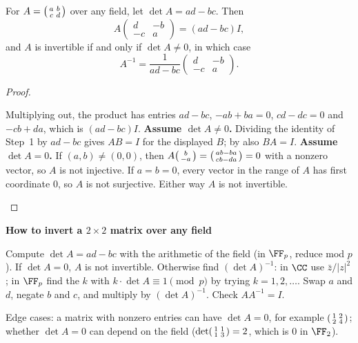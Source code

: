 \documentclass[10pt]{scrartcl}
\newenvironment{methodbox}[1]{\begin{mdframed}[style=methodstyle]\textbf{\color{NavyBlue}#1}\par\vspace{2pt}}{\end{mdframed}}
\begin{document}
\begin{proposition*}
  For $A=\begin{psmallmatrix}a&b\\c&d\end{psmallmatrix}$ over any field, let $\det A=ad-bc$. Then
  \[
    A\begin{pmatrix}d&-b\\-c&a\end{pmatrix}=(ad-bc)I,
  \]
  and $A$ is invertible if and only if $\det A\ne0$, in which case
  \[
    A^{-1}=\frac1{ad-bc}\begin{pmatrix}d&-b\\-c&a\end{pmatrix}.
  \]
\end{proposition*}
\begin{proof}
  \begin{steps}
    \ii Multiplying out, the product has entries $ad-bc$, $-ab+ba=0$, $cd-dc=0$ and $-cb+da$, which is $(ad-bc)I$.
    \ii \textbf{Assume $\det A\ne0$.} Dividing the identity of Step~1 by $ad-bc$ gives $AB=I$ for the displayed $B$; by  also $BA=I$.
    \ii \textbf{Assume $\det A=0$.} If $(a,b)\ne(0,0)$, then $A\begin{psmallmatrix}b\\-a\end{psmallmatrix}=\begin{psmallmatrix}ab-ba\\cb-da\end{psmallmatrix}=0$ with a nonzero vector, so $A$ is not injective. If $a=b=0$, every vector in the range of $A$ has first coordinate $0$, so $A$ is not surjective. Either way $A$ is not invertible.
  \end{steps}
\end{proof}

\begin{methodbox}{How to invert a $2\times2$ matrix over any field}
  \begin{steps}
    \ii Compute $\det A=ad-bc$ with the arithmetic of the field (in $\FF_p$, reduce mod $p$).
    \ii If $\det A=0$, $A$ is not invertible. Otherwise find $(\det A)^{-1}$: in $\CC$ use $\bar z/|z|^2$; in $\FF_p$ find the $k$ with $k\cdot\det A\equiv1\pmod p$ by trying $k=1,2,\dots$.
    \ii Swap $a$ and $d$, negate $b$ and $c$, and multiply by $(\det A)^{-1}$.
    \ii Check $AA^{-1}=I$.
  \end{steps}
  Edge cases: a matrix with nonzero entries can have $\det A=0$, for example $\begin{psmallmatrix}1&2\\2&4\end{psmallmatrix}$; whether $\det A=0$ can depend on the field ($\det\begin{psmallmatrix}1&1\\1&3\end{psmallmatrix}=2$, which is $0$ in $\FF_2$).
\end{methodbox}
\end{document}
